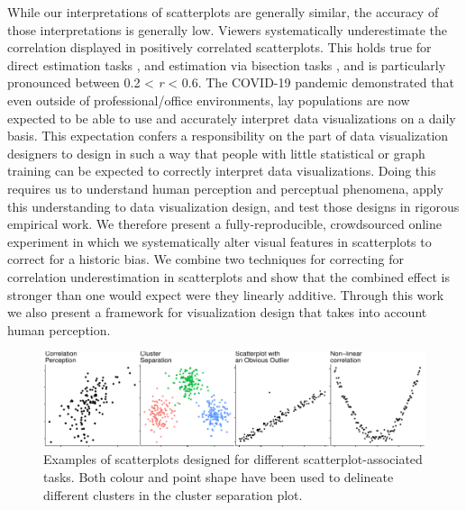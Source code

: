\documentclass[manuscript, review, anonymous, screen]{acmart}
\begin{document}
While our interpretations of scatterplots are generally similar, the
accuracy of those interpretations is generally low. Viewers
systematically underestimate the correlation displayed in positively
correlated scatterplots. This holds true for direct estimation tasks
\citep{strahan_1978, bobko_1979, cleveland_1982, lane_1985, lauer_1989, collyer_1990, meyer_1992},
and estimation via bisection tasks \citep{rensink_2017}, and is
particularly pronounced between 0.2 \textless{} \emph{r} \textless{}
0.6. The COVID-19 pandemic demonstrated that even outside of
professional/office environments, lay populations are now expected to be
able to use and accurately interpret data visualizations on a daily
basis. This expectation confers a responsibility on the part of data
visualization designers to design in such a way that people with little
statistical or graph training can be expected to correctly interpret
data visualizations. Doing this requires us to understand human
perception and perceptual phenomena, apply this understanding to data
visualization design, and test those designs in rigorous empirical work.
We therefore present a fully-reproducible, crowdsourced online
experiment in which we systematically alter visual features in
scatterplots to correct for a historic bias. We combine two techniques
for correcting for correlation underestimation in scatterplots and show
that the combined effect is stronger than one would expect were they
linearly additive. Through this work we also present a framework for
visualization design that takes into account human perception.

\begin{figure}

{\centering \includegraphics[width=1\textwidth,height=\textheight]{size_and_contrast_new_files/figure-pdf/fig-tasks-1.pdf}

}

\caption{\label{fig-tasks}Examples of scatterplots designed for
different scatterplot-associated tasks. Both colour and point shape have
been used to delineate different clusters in the cluster separation
plot.}

\end{figure}
\end{document}

